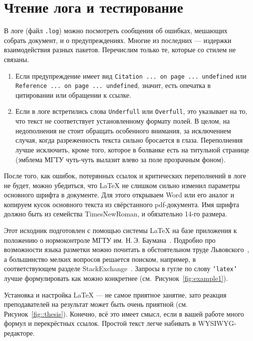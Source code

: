 \documentclass[14pt, russian]{scrartcl}
\begin{document}
\section{Чтение лога и тестирование}

В логе (файл \texttt{.log}) можно посмотреть сообщения об ошибках, мешающих собрать документ, и о предупреждениях. Многие из последних --- издержки взаимодействия разных пакетов. Перечислим только те, которые со стилем не связаны.

\begin{enumerate}
\item Если предупреждение имеет вид \texttt{Citation ... on page ... undefined} или \texttt{Reference ... on page ... undefined}, значит, есть опечатка в цитировании или обращении к ссылке.
\item Если в логе встретились слова \texttt{Underfull} или \texttt{Overfull}, это указывает на то, что текст не соответствует установленному формату полей. В целом, на недополнения не стоит обращать особенного внимания, за исключением случая, когда разреженность текста сильно бросается в глаза. Переполнения лучше исключить, кроме того, которое в болванке есть на титульной странице (эмблема МГТУ чуть-чуть вылазит влево за поле прозрачным фоном).
\end{enumerate}

После того, как ошибок, потерянных ссылок и критических переполнений в логе не будет, можно убедиться, что \LaTeX{} не слишком сильно изменил параметры основного шрифта в документе. Для этого открываем Word или его аналог и копируем кусок основного текста из свёрстанного pdf-документа. Имя шрифта должно быть из семейства  TimesNewRoman, и обязательно 14-го размера.


Этот исходник подготовлен с помощью системы \LaTeX{} на базе приложения к положению о нормоконтроле МГТУ им. Н.\,Э. Баумана~\cite{Normcor}. Подробно про возможности языка разметки можно почитать в обстоятельном труде Львовского~\cite{LaTeX2e}, а большинство мелких вопросов решается поиском, например, в соответствующем разделе StackExchange~\cite{Stackexchange}. Запросы в гугле по слову \texttt{'latex'} лучше формулировать как можно конкретнее (см.~Рисунок~\ref{fig:example1}). 

Установка и настройка \LaTeX{} --- не самое приятное занятие, зато реакция преподавателей на результат может быть очень приятной (см. Рисунок~\ref{fig::thesis}). Конечно, всё это имеет смысл, если в вашей работе много формул и перекрёстных ссылок. Простой текст легче набивать в WYSIWYG-редакторе.
\end{document}
